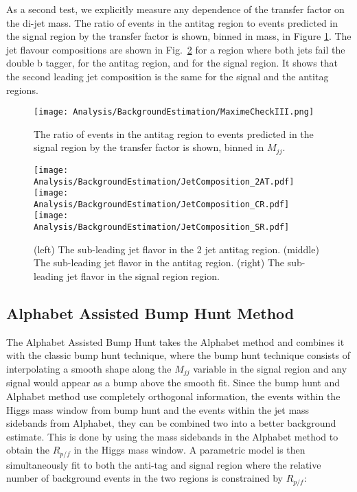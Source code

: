 As a second test, we explicitly measure any dependence of the transfer factor on the di-jet mass. The ratio of events in the antitag region to events predicted in the signal region by the transfer factor is shown, binned in mass, in Figure \ref{F:MaximeCheckII}. The jet flavour compositions are shown in Fig.~\ref{F:JetComposition} for a region where both jets fail the double b tagger, for the antitag region, and for the signal region. It shows that the second leading jet composition is the same for the signal and the antitag regions.

\begin{figure}[H]
  \centering
    \texttt{[image: Analysis/BackgroundEstimation/MaximeCheckIII.png]}
\caption{The ratio of events in the antitag region to events predicted in the signal region by the transfer factor is shown, binned in $M_{jj}$.} \label{F:MaximeCheckII}
\end{figure}

\begin{figure}[H]
  \centering
    \texttt{[image: Analysis/BackgroundEstimation/JetComposition\_2AT.pdf]}
    \texttt{[image: Analysis/BackgroundEstimation/JetComposition\_CR.pdf]}
    \texttt{[image: Analysis/BackgroundEstimation/JetComposition\_SR.pdf]}
\caption{(left) The sub-leading jet flavor in the 2 jet antitag region. (middle) The sub-leading jet flavor in the antitag region. (right) The sub-leading jet flavor in the signal region region.} \label{F:JetComposition}
\end{figure}


\subsection{Alphabet Assisted Bump Hunt Method}

The Alphabet Assisted Bump Hunt takes the Alphabet method and combines it with the classic bump hunt technique, where the bump hunt technique consists of interpolating a smooth shape along the $M_{jj}$ variable in the signal region and any signal would appear as a bump above the smooth fit. Since the bump hunt and Alphabet method use completely orthogonal information, the events within the Higgs mass window from bump hunt and the events within the jet mass sidebands from Alphabet, they can be combined two into a better background estimate. This is done by using the mass sidebands in the Alphabet method to obtain the $R_{p/f}$ in the Higgs mass window. A parametric model is then simultaneously fit to both the anti-tag and signal region where the relative number of background events in the two regions is constrained by $R_{p/f}$:


